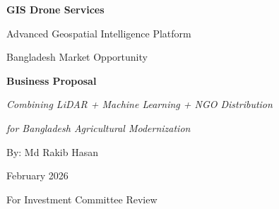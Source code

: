\documentclass[12pt,a4paper,oneside]{book}
\begin{document}

\frontmatter

\begin{titlepage}
    \centering
    \vspace*{2cm}

    {\huge \color{PrimaryBlue} \textbf{GIS Drone Services}}

    \vspace{0.5cm}

    {\Large \color{AccentRed} Advanced Geospatial Intelligence Platform}

    \vspace{0.5cm}

    {\large \color{PrimaryBlue} Bangladesh Market Opportunity}

    \vspace{3cm}

    {\Large \textbf{Business Proposal}}

    \vspace{4cm}

    {\large \textit{Combining LiDAR + Machine Learning + NGO Distribution}}

    \vspace{2cm}

    {\large \textit{for Bangladesh Agricultural Modernization}}

    \vspace{4cm}

    \color{DarkGrey}
    {\large By: Md Rakib Hasan}

    \vspace{1cm}

    {\large February 2026}

    \vspace{1cm}

    {\normalsize For Investment Committee Review}

\end{titlepage}

\tableofcontents


\mainmatter

\end{document}
